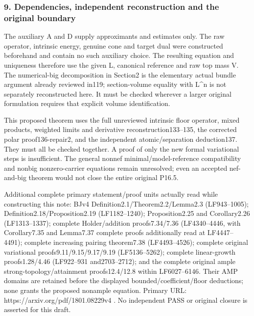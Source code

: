 \documentclass[
]{article}
\begin{document}
\subsubsection{9. Dependencies, independent reconstruction and the
original
boundary}\label{dependencies-independent-reconstruction-and-the-original-boundary}

The auxiliary A and D supply approximants and estimates only. The raw
operator, intrinsic energy, genuine cone and target dual were
constructed beforehand and contain no such auxiliary choice. The
resulting equation and uniqueness therefore use the given L, canonical
reference and raw top mass V. The numerical-big decomposition in
Section2 is the elementary actual bundle argument already reviewed
in119; section-volume equality with L\^{}n is not separately
reconstructed here. It must be checked wherever a larger original
formulation requires that explicit volume identification.

This proposed theorem uses the full unreviewed intrinsic
floor operator, mixed products, weighted limits and derivative reconstruction133--135, the corrected
polar proof136-repair2, and the independent atomic/separation
deduction137. They must all be checked together. A proof of only the new
formal variational steps is insufficient. The general nonnef
minimal/model-reference compatibility and nonbig nonzero-carrier
equations remain unresolved; even an accepted nef-and-big theorem would
not close the entire original P16.5.

Additional complete primary statement/proof units actually read while
constructing this note: BJv4 Definition2.1/Theorem2.2/Lemma2.3
(LF943--1005); Definition2.18/Proposition2.19 (LF1182--1240);
Proposition2.25 and Corollary2.26 (LF1313--1337); complete
Holder/addition proofs7.34/7.36 (LF4340--4446, with Corollary7.35 and
Lemma7.37 complete proofs additionally read at LF4447--4491); complete
increasing pairing theorem7.38 (LF4493--4526); complete original
variational proofs9.11/9.15/9.17/9.19 (LF5136--5262); complete
linear-growth proofs1.28/4.46 (LF922--931 and2703--2712); and the
complete original ample strong-topology/attainment proofs12.4/12.8
within LF6027--6146. Their AMP domains are retained before the displayed
bounded/coefficient/floor deductions; none grants the proposed nonample
equation. Primary URL: https://arxiv.org/pdf/1801.08229v4 . No
independent PASS or original closure is asserted for this draft.
\end{document}
